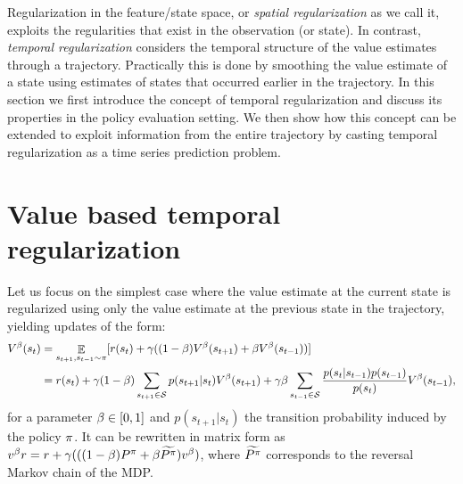 Regularization in the feature/state space, or \emph{spatial regularization} as we call it, exploits the regularities that exist in the observation (or state). In contrast, \emph{temporal regularization} considers the temporal structure of the value estimates through a trajectory. Practically this is done by smoothing the value estimate of a state using estimates of states that occurred earlier in the trajectory.
In this section we first introduce the concept of temporal regularization and discuss its properties in the policy evaluation setting. We then show how this concept can be extended to exploit information from the entire trajectory by casting temporal regularization as a time series prediction problem. 
\section{Value based temporal regularization}
Let us focus on the simplest case where the value estimate at the current state is regularized using only the value estimate at the previous state in the trajectory, yielding updates of the form: %
\begin{equation}
    \begin{split}
        V^{\beta}(s_{t}) &= \mathop{\mathbb{E}}_{s_{t+1},s_{t-1} \sim \pi} [r(s_t) + \gamma ((1-\beta)V^{\beta}(s_{t+1}) + \beta V^{\beta}(s_{t-1}))]\\
         &= r(s_t) + \gamma (1-\beta)\sum_{s_{t+1}\in \mathcal{S}} p(s_{t+1}|s_t)V^{\beta}(s_{t+1})
         + \gamma \beta \sum_{s_{t-1} \in \mathcal{S}}\frac{p(s_t|s_{t-1}) p(s_{t-1})}{p(s_t)} V^{\beta}(s_{t-1}),
    \end{split}
\end{equation}
for a parameter $\beta \in [0,1]$ and $p(s_{t+1}|s_t)$ the transition probability induced by the policy $\pi$. It can be rewritten in matrix form as $v^{\beta} r = r + \gamma (((1-\beta) P^{\pi} + \beta \widetilde{P^{\pi}})v^{\beta}) $, where $\widetilde{P^{\pi}}$ corresponds to the reversal Markov chain of the MDP.
